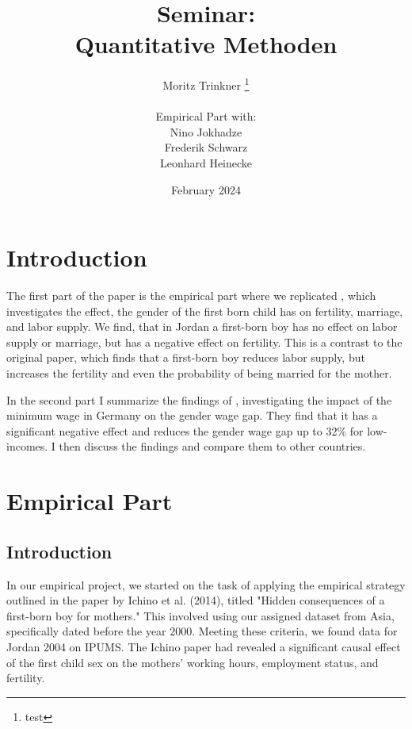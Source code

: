 \documentclass[12pt,draft,a4paper]{article}
\begin{document}
    
\begin{titlepage}

    \author{Moritz Trinkner \thanks {test}
    \\ \\Empirical Part with:
    \\ Nino Jokhadze
    \\ Frederik Schwarz
    \\ Leonhard Heinecke 
    }
    \title{Seminar:\\ Quantitative Methoden}
    \date{February 2024}
\end{titlepage}
\maketitle
\thispagestyle{empty}
\newpage
\tableofcontents
\thispagestyle{empty}
\newpage
\setcounter{page}{1}

\section{Introduction}


The first part of the paper is the empirical part where we replicated , which investigates the effect, the gender of the first born child has on fertility, marriage, and labor supply. We find, that in Jordan a first-born boy has no effect on labor supply or marriage, but has a negative effect on fertility. This is a contrast to the original paper, which finds that a first-born boy reduces labor supply, but increases the fertility and even the probability of being married for the mother.

In the second part I summarize the findings of , investigating the impact of the minimum wage in Germany on the gender wage gap. They find that it has a significant negative effect and reduces the gender wage gap up to 32\% for low-incomes. I then discuss the findings and compare them to other countries.
\newpage
\section{Empirical Part}
\subsection{Introduction} 

In our empirical project, we started on the task of applying the empirical strategy outlined in the paper by Ichino et al. (2014), 
titled "Hidden consequences of a first-born boy for mothers." 
This involved using our assigned dataset from Asia, specifically dated before the year 2000. Meeting these criteria, we found data for Jordan 2004 on IPUMS. 
The Ichino paper had revealed a significant causal effect of the first child sex on the mothers' working hours, employment status, and fertility.
\end{document}
